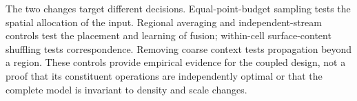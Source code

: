 The two changes target different decisions. Equal-point-budget sampling tests the spatial allocation of the input. Regional averaging and independent-stream controls test the placement and learning of fusion; within-cell surface-content shuffling tests correspondence. Removing coarse context tests propagation beyond a region. These controls provide empirical evidence for the coupled design, not a proof that its constituent operations are independently optimal or that the complete model is invariant to density and scale changes.

